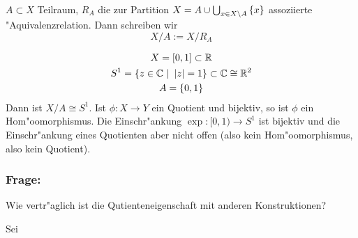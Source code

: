 \begin{dfn}
    $A\subset X$ Teilraum, $R_A$ die zur Partition $X=A\cup \bigcup_{x\in
    X\setminus A} \mdef{x}$ assoziierte "Aquivalenzrelation. Dann schreiben wir
    \[
    X/A := X/R_A
    \]
    \begin{bsp}
        \begin{gather}
            X = [0,1]\subset \R \\
            S^1 = \mdef[z\in\C]{\left|z\right|=1}\subset \C \cong \R^2 \\
            A = \mdef{0,1}
        \end{gather}
        Dann ist $X/A \cong S^1$. Ist $\phi:X\to Y$ ein Quotient und bijektiv,
        so ist $\phi$ ein Hom"oomorphismus. Die Einschr"ankung $\exp : [0,1)
        \to S^1$ ist bijektiv und die Einschr"ankung eines Quotienten aber
        nicht offen (also kein Hom"oomorphismus, also kein Quotient).

        \subsubsection*{Frage:} Wie vertr"aglich ist die Qutienteneigenschaft
        mit anderen Konstruktionen?
    \end{bsp}
\end{dfn}

\begin{dfn}
 Sei 
\end{dfn}
